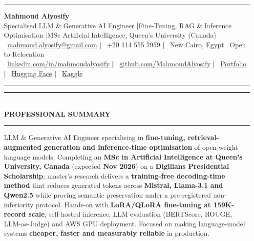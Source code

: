 \documentclass[10pt, a4paper]{article}
\newcommand{\faEnvelope}{}\newcommand{\faPhone}{}\newcommand{\faMapMarker}{}%
\newcommand{\faLinkedin}{}\newcommand{\faGithub}{}\newcommand{\faRobot}{}%
\newcommand{\faChartBar}{}\newcommand{\faGlobe}{}%
\newcommand{\cvsection}[1]{%
  \vspace{3pt}%
  {\color{navy}\rule{\linewidth}{1.1pt}}\\[0.5pt]%
  {\color{navy}\bfseries\fontsize{9.5}{11}\selectfont\uppercase{#1}}\\[-4pt]%
  {\color{teal}\rule{\linewidth}{0.6pt}}%
  \vspace{2pt}%
}
\begin{document}
\small

{\color{navy}\rule{\linewidth}{1.5pt}}

\vspace{3pt}
\begin{center}
  {\fontsize{21}{24}\bfseries\color{navy} Mahmoud Alyosify}\\[3pt]
  {\fontsize{10}{12}\color{teal}
    Specialised LLM \& Generative AI Engineer \enspace|\enspace Fine-Tuning, RAG \& Inference Optimisation
    \enspace|\enspace MSc Artificial Intelligence, Queen's University (Canada)
}\\[4pt]
  {\color{midgray}
    \faEnvelope\ \href{mailto:mahmoud.alyosify@gmail.com}{mahmoud.alyosify@gmail.com}
    \enspace|\enspace
    \faPhone\ +20 114 555 7959
    \enspace|\enspace
    \faMapMarker\ New Cairo, Egypt \textperiodcentered\ Open to Relocation}\\[2pt]
  {\faLinkedin\ \href{https://linkedin.com/in/mahmoudalyosify}{linkedin.com/in/mahmoudalyosify}
    \enspace|\enspace
    \faGithub\ \href{https://github.com/MahmoudAlyosify}{github.com/MahmoudAlyosify}
    \enspace|\enspace
    \faGlobe\ \href{https://mahmoudalyosifysite.github.io/}{Portfolio}
    \enspace|\enspace
    \faRobot\ \href{https://huggingface.co/mahmoudalyosify}{Hugging Face}
    \enspace|\enspace
    \faChartBar\ \href{https://kaggle.com/mahmoudalyosify}{Kaggle}}
\end{center}

{\color{navy}\rule{\linewidth}{1.5pt}}

\vspace{2pt}

\cvsection{Professional Summary}

{\color{darkgray}\justifying
LLM \& Generative AI Engineer specialising in \textbf{fine-tuning, retrieval-augmented generation and inference-time optimisation} of open-weight language models. Completing an \textbf{MSc in Artificial Intelligence at Queen's University, Canada} (expected \textbf{Nov 2026}) on a \textbf{Digilians Presidential Scholarship}; master's research delivers a \textbf{training-free decoding-time method} that reduces generated tokens across \textbf{Mistral, Llama-3.1 and Qwen2.5} while proving semantic preservation under a pre-registered non-inferiority protocol. Hands-on with \textbf{LoRA/QLoRA fine-tuning at 159K-record scale}, self-hosted inference, LLM evaluation (BERTScore, ROUGE, LLM-as-Judge) and AWS GPU deployment. Focused on making language-model systems \textbf{cheaper, faster and measurably reliable} in production.}
\end{document}
